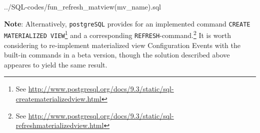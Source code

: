 %
{../SQL-codes/fun_refresh_matview(mv_name).sql}



{\bf Note}: Alternatively, \texttt{\footnotesize postgreSQL} provides for an implemented command \texttt{\footnotesize CREATE MATERIALIZED VIEW}\footnote{See \url{http://www.postgresql.org/docs/9.3/static/sql-creatematerializedview.html}} and a corresponding \texttt{\footnotesize REFRESH}-command.\footnote{See \url{http://www.postgresql.org/docs/9.3/static/sql-refreshmaterializedview.html}}
It is worth considering to re-implement materialized view Configuration Events with the built-in commands in a beta version, though the solution described above appeares to yield the same result.